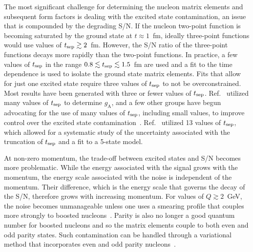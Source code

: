\documentclass{ar-1col}
\def\tsep{t_{\rm sep}}
\begin{document}
The most significant challenge for determining the nucleon matrix elements and subsequent form factors is dealing with the excited state contamination, an issue that is compounded by the degrading S/N.
If the nucleon two-point function is becoming saturated by the ground state at $t\approx1$~fm, ideally three-point functions would use values of $\tsep\gtrsim 2$~fm.
However, the S/N ratio of the three-point functions decays more rapidly than the two-point functions.
In practice, a few values of $\tsep$ in the range $0.8 \lesssim \tsep \lesssim 1.5$~fm are used and a fit to the time dependence is used to isolate the ground state matrix elements.
Fits that allow for just one excited state require three values of $\tsep$ to not be overconstrained.
Most results have been generated with three or fewer values of $\tsep$.
Ref.~\cite{Chang:2018uxx} utilized many values of $\tsep$ to determine $g_{\mathrm{A}}$, and a few other groups have begun advocating for the use of many values of $\tsep$, including small values, to improve control over the excited state contamination~\cite{Hasan:2019noy,Alexandrou:2019brg,He:2021yvm}.
Ref.~\cite{He:2021yvm} utilized 13 values of $\tsep$, which allowed for a systematic study of the uncertainty associated with the truncation of $\tsep$ and a fit to a 5-state model.

At non-zero momentum, the trade-off between excited states and S/N becomes more problematic.
While the energy associated with the signal grows with the momentum, the energy scale associated with the noise is independent of the momentum. Their difference, which is the energy scale that governs the decay of the S/N, therefore grows with increasing momentum.
For values of $Q\gtrsim 2$~GeV, the noise becomes unmanageable unless one uses a smearing profile that couples more strongly to boosted nucleons~\cite{Bali:2016lva}.
Parity is also no longer a good quantum number for boosted nucleons and so the matrix elements couple to both even and odd parity states.  Such contamination can be handled through a variational method that incorporates even and odd parity nucleons~\cite{Stokes:2013fgw,Stokes:2018emx,Stokes:2019zdd}.
\end{document}
